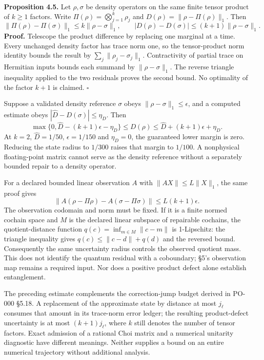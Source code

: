 \documentclass[
  11pt,
]{article}
\begin{document}
\textbf{Proposition 4.5.} Let \(\rho,\sigma\) be density operators on the same finite tensor product of \(k\ge1\) factors. Write \(\Pi(\rho)=\bigotimes_{j=1}^k\rho_j\) and \(D(\rho)=\|\rho-\Pi(\rho)\|_1\). Then
\[
\|\Pi(\rho)-\Pi(\sigma)\|_1\le k\|\rho-\sigma\|_1,
\qquad
|D(\rho)-D(\sigma)|\le(k+1)\|\rho-\sigma\|_1.
\]
\textbf{Proof.} Telescope the product difference by replacing one marginal at a time. Every unchanged density factor has trace norm one, so the tensor-product norm identity bounds the result by \(\sum_j\|\rho_j-\sigma_j\|_1\). Contractivity of partial trace on Hermitian inputs bounds each summand by \(\|\rho-\sigma\|_1\). The reverse triangle inequality applied to the two residuals proves the second bound. No optimality of the factor \(k+1\) is claimed. \(\square\)

Suppose a validated density reference \(\sigma\) obeys
\(\|\rho-\sigma\|_1\le\epsilon\), and a computed estimate obeys
\(|\widehat D-D(\sigma)|\le\eta_D\). Then
\[
\max\{0,\widehat D-(k+1)\epsilon-\eta_D\}
\le D(\rho)\le
\widehat D+(k+1)\epsilon+\eta_D.
\]
At \(k=2\), \(\widehat D=1/50\), \(\epsilon=1/150\) and \(\eta_D=0\), the guaranteed lower margin is zero. Reducing the state radius to \(1/300\) raises that margin to \(1/100\). A nonphysical floating-point matrix cannot serve as the density reference without a separately bounded repair to a density operator.

For a declared bounded linear observation \(A\) with
\(\|AX\|\le L\|X\|_1\), the same proof gives
\[
\|A(\rho-\Pi\rho)-A(\sigma-\Pi\sigma)\|
\le L(k+1)\epsilon.
\]
The observation codomain and norm must be fixed. If it is a finite normed cochain space and \(M\) is the declared linear subspace of repairable cochains, the quotient-distance function
\(q(c)=\inf_{m\in M}\|c-m\|\) is 1-Lipschitz: the triangle inequality gives \(q(c)\le\|c-d\|+q(d)\) and the reversed bound. Consequently the same uncertainty radius controls the observed quotient mass. This does not identify the quantum residual with a coboundary; §5's observation map remains a required input. Nor does a positive product defect alone establish entanglement.

The preceding estimate complements the correction-jump budget derived in PO-000 §5.18. A replacement of the approximate state by distance at most \(j_\ell\) consumes that amount in its trace-norm error ledger; the resulting product-defect uncertainty is at most \((k+1)j_\ell\), where \(k\) still denotes the number of tensor factors. Exact admission of a rational Choi matrix and a numerical unitarity diagnostic have different meanings. Neither supplies a bound on an entire numerical trajectory without additional analysis.
\end{document}
